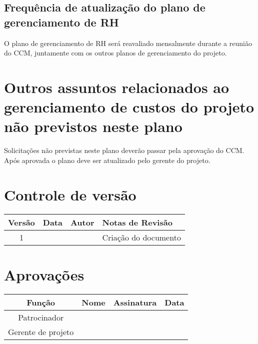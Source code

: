 \subsection{Frequência de atualização do plano de gerenciamento de RH}

O plano de gerenciamento de RH será reavaliado mensalmente durante a reunião do CCM, juntamente com os outros planos de gerenciamento do projeto.

\section{Outros assuntos relacionados ao gerenciamento de custos do projeto não previstos neste plano}

Solicitações não previstas neste plano deverão passar pela aprovação do CCM. Após aprovada o plano deve ser atualizado pelo gerente do projeto.

\section{Controle de versão}

\begin{table}[H]
	\begin{tabularx}{\textwidth}{| c | c | X | X |}
		\hline
		\textbf{Versão} & \textbf{Data} & \textbf{Autor}        & \textbf{Notas de Revisão} \\
		\hline
		1                &               & \projectManagerName{} & Criação do documento     \\
		\hline
	\end{tabularx}
	\centering
\end{table}

\section{Aprovações}

\begin{table}[H]
	\begin{tabularx}{\textwidth}{| c | c | X | c |}
		\hline
		\textbf{Função}  & \textbf{Nome}         & \textbf{Assinatura}        & \textbf{Data} \\
		\hline
		Patrocinador       & \projectSponsorName{} & \projectSponsorSignature{} &               \\
		\hline
		Gerente de projeto & \projectManagerName{} & \projectManagerSignature{} &               \\
		\hline
	\end{tabularx}
	\centering
\end{table}